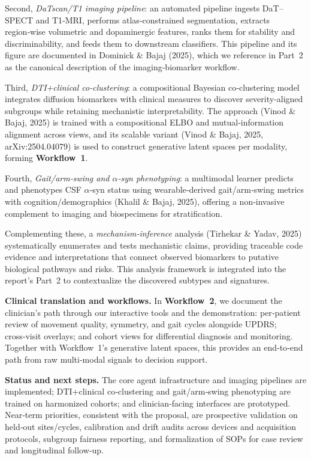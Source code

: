 \documentclass[11pt]{article}
\begin{document}
Second, \emph{DaTscan/T1 imaging pipeline}: an automated pipeline ingests DaT--SPECT and T1‑MRI, performs atlas‑constrained segmentation, extracts region‑wise volumetric and dopaminergic features, ranks them for stability and discriminability, and feeds them to downstream classifiers. This pipeline and its figure are documented in Dominick \& Bajaj (2025), which we reference in Part~2 as the canonical description of the imaging‑biomarker workflow.

Third, \emph{DTI+clinical co‑clustering}: a compositional Bayesian co‑clustering model integrates diffusion biomarkers with clinical measures to discover severity‑aligned subgroups while retaining mechanistic interpretability. The approach (Vinod \& Bajaj, 2025) is trained with a compositional ELBO and mutual‑information alignment across views, and its scalable variant (Vinod \& Bajaj, 2025, arXiv:2504.04079) is used to construct generative latent spaces per modality, forming \textbf{Workflow~1}.

Fourth, \emph{Gait/arm‑swing and $\alpha$‑syn phenotyping}: a multimodal learner predicts and phenotypes CSF $\alpha$‑syn status using wearable‑derived gait/arm‑swing metrics with cognition/demographics (Khalil \& Bajaj, 2025), offering a non‑invasive complement to imaging and biospecimens for stratification.

Complementing these, a \emph{mechanism‑inference} analysis (Tirhekar \& Yadav, 2025) systematically enumerates and tests mechanistic claims, providing traceable code evidence and interpretations that connect observed biomarkers to putative biological pathways and risks. This analysis framework is integrated into the report’s Part~2 to contextualize the discovered subtypes and signatures.

\textbf{Clinical translation and workflows.} In \textbf{Workflow~2}, we document the clinician’s path through our interactive tools and the demonstration: per‑patient review of movement quality, symmetry, and gait cycles alongside UPDRS; cross‑visit overlays; and cohort views for differential diagnosis and monitoring. Together with Workflow~1’s generative latent spaces, this provides an end‑to‑end path from raw multi‑modal signals to decision support.

\textbf{Status and next steps.} The core agent infrastructure and imaging pipelines are implemented; DTI+clinical co‑clustering and gait/arm‑swing phenotyping are trained on harmonized cohorts; and clinician‑facing interfaces are prototyped. Near‑term priorities, consistent with the proposal, are prospective validation on held‑out sites/cycles, calibration and drift audits across devices and acquisition protocols, subgroup fairness reporting, and formalization of SOPs for case review and longitudinal follow‑up. 
\end{document}
